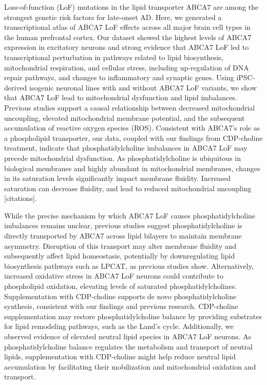 
Loss-of-function (LoF) mutations in the lipid transporter ABCA7 are among the strongest genetic risk factors for late-onset AD. Here, we generated a transcriptional atlas of ABCA7 LoF effects across all major brain cell types in the human prefrontal cortex. Our dataset showed the highest levels of ABCA7 expression in excitatory neurons and strong evidence that ABCA7 LoF led to transcriptional perturbation in pathways related to lipid biosynthesis, mitochondrial respiration, and cellular stress, including up-regulation of DNA repair pathways, and changes to inflammatory and synaptic genes. Using iPSC-derived isogenic neuronal lines with and without ABCA7 LoF variants, we show that ABCA7 LoF lead to mitochondrial dysfunction and lipid imbalances.  Previous studies support a causal relationship between decreased mitochondrial uncoupling, elevated mitochondrial membrane potential, and the subsequent accumulation of reactive oxygen species (ROS). Consistent with ABCA7's role as a phospholipid transporter, our data, coupled with our findings from CDP-choline treatment, indicate that phosphatidylcholine imbalances in ABCA7 LoF may precede mitochondrial dysfunction. As phosphatidylcholine is ubiquitous in biological membranes and highly abundant in mitochondrial membranes, changes in its saturation levels significantly impact membrane fluidity. Increased saturation can decrease fluidity, and lead to reduced mitochondrial uncoupling [citations].

While the precise mechanism by which ABCA7 LoF causes phosphatidylcholine imbalances remains unclear, previous studies suggest phosphatidylcholine is directly transported by ABCA7 across lipid bilayers to maintain membrane asymmetry. Disruption of this transport may alter membrane fluidity and subsequently affect lipid homeostasis, potentially by downregulating lipid biosynthesis pathways such as LPCAT, as previous studies show. Alternatively, increased oxidative stress in ABCA7 LoF neurons could contribute to phospholipid oxidation, elevating levels of saturated phosphatidylcholines. Supplementation with CDP-choline supports de novo phosphatidylcholine synthesis, consistent with our findings and previous research. CDP-choline supplementation may restore phosphatidylcholine balance by providing substrates for lipid remodeling pathways, such as the Land’s cycle. Additionally, we observed evidence of elevated neutral lipid species in ABCA7 LoF neurons. As phosphatidylcholine balance regulates the metabolism and transport of neutral lipids, supplementation with CDP-choline might help reduce neutral lipid accumulation by facilitating their mobilization and mitochondrial oxidation and transport. 

